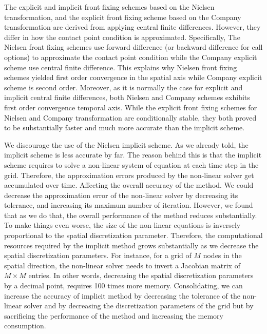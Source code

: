 The explicit and implicit front fixing schemes based on the Nielsen transformation, and the explicit front fixing scheme based on the Company transformation are derived from applying central finite differences. However, they differ in how the contact point condition is approximated. Specifically, The Nielsen front fixing schemes use forward difference (or backward difference for call options) to approximate the contact point condition while the Company explicit scheme use central finite difference. This explains why Nielsen front fixing schemes yielded first order convergence in the spatial axis while Company explicit scheme is second order. Moreover, as it is normally the case for explicit and implicit central finite differences, both Nielsen and Company schemes exhibits first order convergence temporal axis. While the explicit front fixing schemes for Nielsen and Company transformation are conditionally stable, they both proved to be substantially faster and much more accurate than the implicit scheme. 

We discourage the use of the Nielsen implicit scheme. As we already told, the implicit scheme is less accurate by far. The reason behind this is that the implicit scheme requires to solve a non-linear system of equation at each time step in the grid. Therefore, the approximation errors produced by the non-linear solver get accumulated over time. Affecting the overall accuracy of the method. We could decrease the approximation error of the non-linear solver by decreasing its tolerance, and increasing its maximum number of iteration. However, we found that as we do that, the overall performance of the method reduces substantially. To make things even worse, the size of the non-linear equations is inversely proportional to the spatial discretization parameter. Therefore, the computational resources required by the implicit method grows substantially as we decrease the spatial discretization parameters. For instance, for a grid of $M$ nodes in the spatial direction, the non-linear solver needs to invert a Jacobian matrix of $M\times M$ entries. In other words, decreasing the spatial discretization parameters by a decimal point, requires 100 times more memory. Consolidating, we can increase the accuracy of implicit method by decreasing the tolerance of the non-linear solver and by decreasing the discretization parameters of the grid but by sacrificing the performance of the method and increasing the memory consumption.

